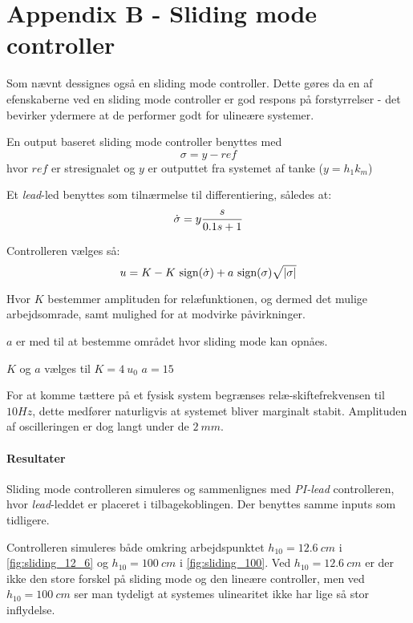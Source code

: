 \section*{Appendix B - Sliding mode controller}
\newcommand{\sign}{\mbox{sign}}
Som nævnt dessignes også en sliding mode controller.
Dette gøres da en af efenskaberne ved en sliding mode controller er god respons
på forstyrrelser - det bevirker ydermere at de performer godt for ulineære
systemer.

En output baseret sliding mode controller benyttes med
\begin{equation*}
\sigma = y - ref
\end{equation*}
hvor $ref$ er stresignalet og $y$ er outputtet fra systemet af tanke ($y = h_1
k_m$)

Et \emph{lead}-led benyttes som tilnærmelse til differentiering, således at:
\begin{equation*}
\dot\sigma = y \frac{s}{0.1s + 1}
\end{equation*}

Controlleren vælges så:
\begin{equation*}
u = K - K ~\sign( \diff\sigma ) + a ~ \sign(\sigma)\sqrt{\abs{\sigma}}
\end{equation*}

Hvor $K$ bestemmer amplituden for relæfunktionen, og dermed det mulige
arbejdsomrade, samt mulighed for at modvirke påvirkninger.

$a$ er med til at bestemme området hvor sliding mode kan opnåes.

$K$ og $a$ vælges til $K = 4~u_0$ $a=15$

For at komme tættere på et fysisk system begrænses relæ-skiftefrekvensen til
$10Hz$, dette medfører naturligvis at systemet bliver marginalt stabit.
Amplituden af oscilleringen er dog langt under de $2~mm$.

\paragraph{ Resultater }
Sliding mode controlleren simuleres og sammenlignes med \emph{PI-lead}
controlleren, hvor \emph{lead}-leddet er placeret i tilbagekoblingen. Der
benyttes samme inputs som tidligere.

Controlleren simuleres både omkring arbejdspunktet $h_{10} = 12.6~cm$ i
\ref{fig:sliding_12_6} og $h_{10} = 100~cm$ i \ref{fig:sliding_100}.
Ved $h_{10} = 12.6~cm$ er der ikke den store forskel på sliding mode og den
lineære controller, men ved $h_{10} = 100~cm$ ser man tydeligt at systemes
ulinearitet ikke har lige så stor inflydelse.


